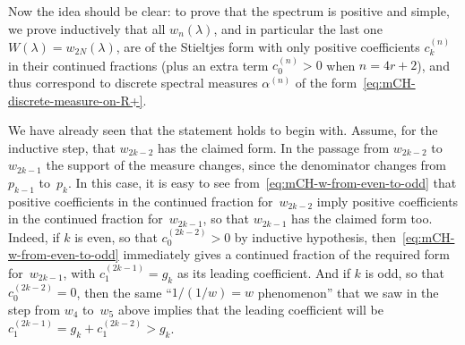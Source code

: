 \documentclass[10pt,a4paper]{article} \pdfoutput=1 
\begin{document}
Now the idea should be clear: to prove that the spectrum is positive and simple,
we prove inductively that all $w_n(\lambda)$, and in particular the last one $W(\lambda) = w_{2N}(\lambda)$,
are of the Stieltjes form with only
positive coefficients $c_k^{(n)}$ in their continued fractions
(plus an extra term $c_0^{(n)}>0$ when $n = 4r+2$),
and thus correspond to discrete spectral measures $\alpha^{(n)}$
of the form~\eqref{eq:mCH-discrete-measure-on-R+}.

We have already seen that the statement holds to begin with.
Assume, for the inductive step, that $w_{2k-2}$ has the claimed form.
In the passage from $w_{2k-2}$ to~$w_{2k-1}$
the support of the measure changes, since the denominator changes from $p_{k-1}$ to~$p_{k}$.
In this case, it is easy to see from~\eqref{eq:mCH-w-from-even-to-odd}
that positive coefficients in the continued fraction for~$w_{2k-2}$
imply positive coefficients in the continued fraction for~$w_{2k-1}$,
so that $w_{2k-1}$ has the claimed form too.
Indeed, if $k$ is even, so that $c_0^{(2k-2)} > 0$ by inductive hypothesis,
then~\eqref{eq:mCH-w-from-even-to-odd} immediately gives a
continued fraction of the required form for~$w_{2k-1}$, with $c_1^{(2k-1)} = g_{k}$
as its leading coefficient.
And if $k$ is odd, so that $c_0^{(2k-2)} = 0$,
then the same ``$1/(1/w)=w$ phenomenon'' that we saw in the step from $w_{4}$ to~$w_{5}$ above
implies that the leading coefficient will be $c_1^{(2k-1)} = g_{k} + c_1^{(2k-2)} > g_{k}$.
\end{document}
